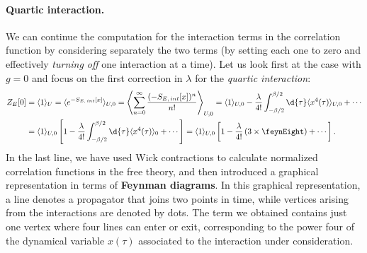 \paragraph{Quartic interaction.} We can continue the computation for the interaction terms in the correlation function by considering separately the two terms (by setting each one to zero and effectively \textit{turning off} one interaction at a time). Let us look first at the case with \(g=0\) and focus on the first correction in \(\lambda\) for the \textit{quartic interaction}:
\[
    \begin{aligned}
        Z_E[0] & = \langle 1 \rangle_U = \langle e^{-S_{E,\,int}[x]} \rangle_{U,0} = \left\langle \sum_{n=0}^{\infty} \frac{(-S_{E,\,int}[x])^n}{n!} \right\rangle_{U,0} = \langle 1 \rangle_{U,0} -\frac{\lambda}{4!} \int_{-\beta/2}^{\beta/2} \d{\tau} \langle x^4(\tau) \rangle_{U,0} + \cdots \\
               & = \langle 1 \rangle_{U,0} \left[ 1 -\frac{\lambda}{4!} \int_{-\beta/2}^{\beta/2} \d{\tau} \langle x^4(\tau) \rangle_{0} +\cdots \right] = \langle 1 \rangle_{U,0} \left[ 1 -\frac{\lambda}{4!} \left( 3\times \feynEight \right) + \cdots \right].
    \end{aligned}
\]
In the last line, we have used Wick contractions to calculate normalized correlation functions in the free theory, and then introduced a graphical representation in terms of \textbf{Feynman diagrams}. In this graphical representation, a line denotes a propagator that joins two points in time, while vertices arising from the interactions are denoted by dots. The term we obtained contains just one vertex where four lines can enter or exit, corresponding to the power four of the dynamical variable \(x(\tau)\) associated to the interaction under consideration.

